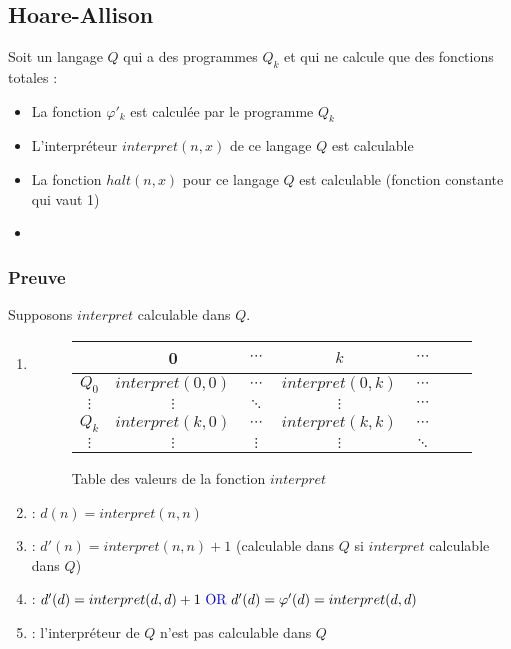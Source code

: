 \newpage
\subsection{Hoare-Allison}

Soit un langage $Q$ qui a des programmes $Q_k$ et qui ne calcule que des fonctions totales :
\begin{itemize}
\item La fonction $\varphi'_k$ est calculée par le programme $Q_k$
\item L'interpréteur $interpret(n,x)$ de ce langage $Q$ est calculable
\item La fonction $halt(n,x)$ pour ce langage $Q$ est calculable (fonction constante qui vaut 1)
\item {}
\end{itemize}

\subsubsection{Preuve}

Supposons $interpret$ calculable dans $Q$.

\begin{enumerate}
\item {}
	\begin{figure}[H]
    		\centering
    		\begin{tabular}{c|cccccc}
		 & 0 & $\cdots$ & $k$ & $\cdots$ \\ 
		\hline 
		$Q_0$ & $interpret(0,0)$ & $\cdots$ & $interpret(0,k)$ & $\cdots$ \\
		$\vdots$ & $\vdots$ & $\ddots$ & $\vdots$ & $\cdots$ \\ 
		$Q_k$ & $interpret(k,0)$ & $\cdots$ & $interpret(k,k)$ & $\cdots$ \\ 
		$\vdots$ & $\vdots$ & $\vdots$ & $\vdots$ & $\ddots$ \\ 
		\end{tabular}
		\caption{Table des valeurs de la fonction $interpret$}
	\end{figure}
\item {} : $d(n) = interpret(n,n)$
\item {} : $d'(n)= interpret(n,n) + 1$ (calculable dans $Q$ si $interpret$ calculable dans $Q$)
\item {} : $d'(d)= interpret(d,d) + 1 \text{ \blue{OR} } d'(d) = \varphi'(d) = interpret(d,d)$
\item {} : l’interpréteur de $Q$ n'est pas calculable dans $Q$
\end{enumerate}

